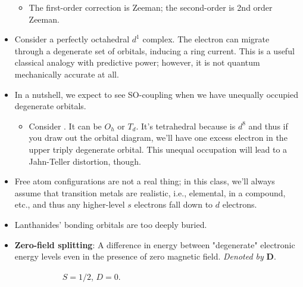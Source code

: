 \documentclass[../notes.tex]{subfiles}
\begin{document}
\begin{itemize}
\begin{itemize}
        \item The first-order correction is Zeeman; the second-order is 2nd order Zeeman.
    \end{itemize}
    \item Consider a perfectly octahedral $d^1$ complex. The electron can migrate through a degenerate set of orbitals, inducing a ring current. This is a useful classical analogy with predictive power; however, it is not quantum mechanically accurate at all.
    \item In a nutshell, we expect to see SO-coupling when we have unequally occupied degenerate orbitals.
    \begin{itemize}
        \item Consider . It can be $O_h$ or $T_d$. It's tetrahedral because  is $d^8$ and thus if you draw out the orbital diagram, we'll have one excess electron in the upper triply degenerate orbital. This unequal occupation will lead to a Jahn-Teller distortion, though.
    \end{itemize}
    \item Free atom configurations are not a real thing; in this class, we'll always assume that transition metals are realistic, i.e., elemental, in a compound, etc., and thus any higher-level $s$ electrons fall down to $d$ electrons.
    \item Lanthanides' bonding orbitals are too deeply buried.
    \item \textbf{Zero-field splitting}: A difference in energy between "degenerate" electronic energy levels even in the presence of zero magnetic field. \emph{Denoted by} $\bm{D}$.
    \begin{figure}[h!]
        \centering
        \footnotesize
        \begin{subfigure}[b]{0.49\linewidth}
            \centering
            \caption{$S=1/2$, $D=0$.}
            \label{fig:zeroFieldSplita}
        \end{subfigure}
        \begin{subfigure}[b]{0.49\linewidth}
            \centering
\end{subfigure}
\end{figure}
\end{itemize}
\end{document}

